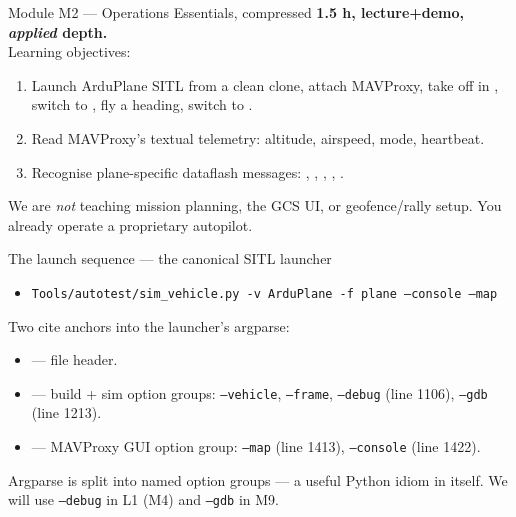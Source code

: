 \documentclass[aspectratio=169,11pt]{beamer}
\begin{document}
\begin{frame}[allowframebreaks]{Module M2 --- Operations Essentials, compressed}
  \textbf{1.5 h, lecture+demo, \emph{applied} depth.}\\[1ex]
  Learning objectives:
  \begin{enumerate}
    \item Launch ArduPlane SITL from a clean clone, attach MAVProxy, take off in , switch to , fly a heading, switch to .
    \item Read MAVProxy's textual telemetry: altitude, airspeed, mode, heartbeat.
    \item Recognise plane-specific dataflash messages: , , , , .
  \end{enumerate}
  \vfill
  We are \emph{not} teaching mission planning, the GCS UI, or geofence/rally setup. You already operate a proprietary autopilot.
\end{frame}

\begin{frame}[allowframebreaks]{The launch sequence --- the canonical SITL launcher}
  \begin{itemize}
    \item[\$] \texttt{Tools/autotest/sim\_vehicle.py -v ArduPlane -f plane --console --map}
  \end{itemize}
  Two cite anchors into the launcher's argparse:
  \begin{itemize}
    \item {} --- file header.
    \item {} --- build + sim option groups: \texttt{--vehicle}, \texttt{--frame}, \texttt{--debug} (line 1106), \texttt{--gdb} (line 1213).
    \item {} --- MAVProxy GUI option group: \texttt{--map} (line 1413), \texttt{--console} (line 1422).
  \end{itemize}
  \vfill
  Argparse is split into named option groups --- a useful Python idiom in itself. We will use \texttt{--debug} in L1 (M4) and \texttt{--gdb} in M9.
\end{frame}
\end{document}

